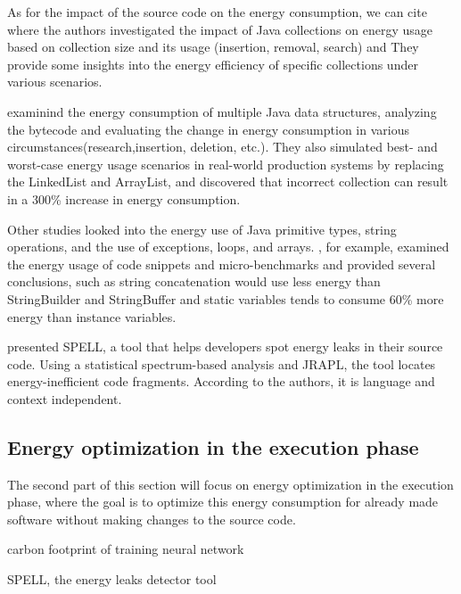 As for the impact of the source code on the energy consumption, we can cite~\cite{pinto_comprehensive_2016,fernandes_assisting_2017} where the authors investigated the impact of Java collections on energy usage based on collection size and its usage (insertion, removal, search) and They provide some insights into the energy efficiency of specific collections under various scenarios.

\citeauthor{hasan_energy_2016} examinind the energy consumption of multiple Java data structures, analyzing the bytecode and evaluating the change in energy consumption in various circumstances(research,insertion, deletion, etc.). They also simulated best- and worst-case energy usage scenarios in real-world production systems by replacing the LinkedList and ArrayList, and discovered that incorrect collection can result in a 300\% increase in energy consumption\cite{hasan_energy_2016}.

Other studies\cite{longo_reducing_2019,kumar_energy_2017} looked into the energy use of Java primitive types, string operations, and the use of exceptions, loops, and arrays. \citeauthor{kumar_energy_2017}, for example, examined the energy usage of code snippets and micro-benchmarks and provided several conclusions, such as string concatenation would use less energy than StringBuilder and StringBuffer and static variables tends to consume 60\% more energy than instance variables.

\citeauthor{pereira_helping_2017} \cite{pereira_helping_2017} presented SPELL, a tool that helps developers spot energy leaks in their source code. Using a statistical spectrum-based analysis and JRAPL\cite{guimaraes2016some,liu_data-oriented_2015}, the tool locates energy-inefficient code fragments. According to the authors, it is language and context independent.

\subsection{Energy optimization in the execution phase}

The second part of this section will focus on energy optimization in the execution phase, where the goal is to optimize this energy consumption for already made software without making changes to the source code.




carbon footprint of training neural network \cite{strubell2019energy}

SPELL, the energy leaks detector tool \cite{pereira2017helping}

